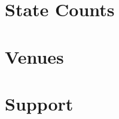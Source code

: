 \documentclass[8pt]{book}
\begin{document}



\chapter{State Counts}




\chapter{Venues}



\chapter{Support}


\end{document}
